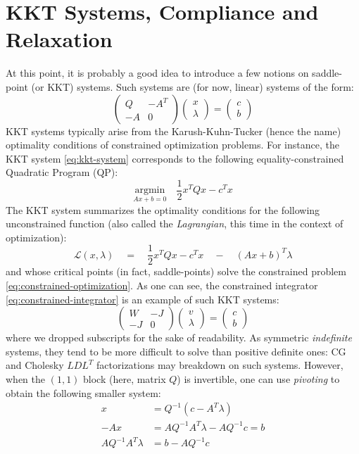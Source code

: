 \documentclass{article}
\newcommand{\LL}{\mathcal{L}}
\newcommand{\half}{\frac{1}{2}}
\newcommand{\block}[1]{\left(#1\right)}
\newcommand{\mat}[1]{ \begin{pmatrix} #1 \end{pmatrix} }
\newcommand{\inv}[1]{#1^{-1}}
\begin{document}
\section{KKT Systems, Compliance and Relaxation}
%
At this point, it is probably a good idea to introduce a few notions
on saddle-point (or KKT) systems. Such systems are (for now, linear)
systems of the form:
%
\begin{equation}
 \label{eq:kkt-system}
 \mat{Q & -A^T \\-A & 0} \mat{x\\\lambda} = \mat{c\\b}
\end{equation}
%
KKT systems typically arise from the Karush-Kuhn-Tucker (hence the
name) optimality conditions of constrained optimization problems. For
instance, the KKT system \eqref{eq:kkt-system} corresponds to the
following equality-constrained Quadratic Program (QP):
%
\begin{equation}
  \label{eq:constrained-optimization}
  \underset{Ax + b = 0}{\textrm{argmin}} \quad \half x^T Q x - c^T x
\end{equation}
%
The KKT system summarizes the optimality conditions for the following
unconstrained function (also called the \emph{Lagrangian}, this time in the
context of optimization):
%
\begin{equation}
  \LL(x, \lambda) \quad = \quad \half x^T Q x - c^T x \quad - \quad \block{A x + b}^T \lambda
\end{equation}
%
and whose critical points (in fact, saddle-points) solve the
constrained problem \eqref{eq:constrained-optimization}. As one can
see, the constrained integrator \eqref{eq:constrained-integrator} is
an example of such KKT systems:
\begin{equation}
  \mat{W & -J\\-J & 0} \mat{v \\ \lambda} = \mat{c \\ b}
\end{equation}
%
where we dropped subscripts for the sake of readability. As symmetric
\emph{indefinite} systems, they tend to be more difficult to solve
than positive definite ones: CG and Cholesky $LDL^T$ factorizations
may breakdown on such systems. However, when the $(1, 1)$ block (here,
matrix $Q$) is invertible, one can use \emph{pivoting} to obtain the
following smaller system:
%
\begin{align}
  x &= \inv{Q}\block{c - A^T \lambda} \\
  -A x &= A\inv{Q}A^T \lambda - A\inv{Q} c = b \\
  \label{eq:schur-complement}
  A\inv{Q}A^T\lambda &= b - A \inv{Q} c
\end{align}
\end{document}
